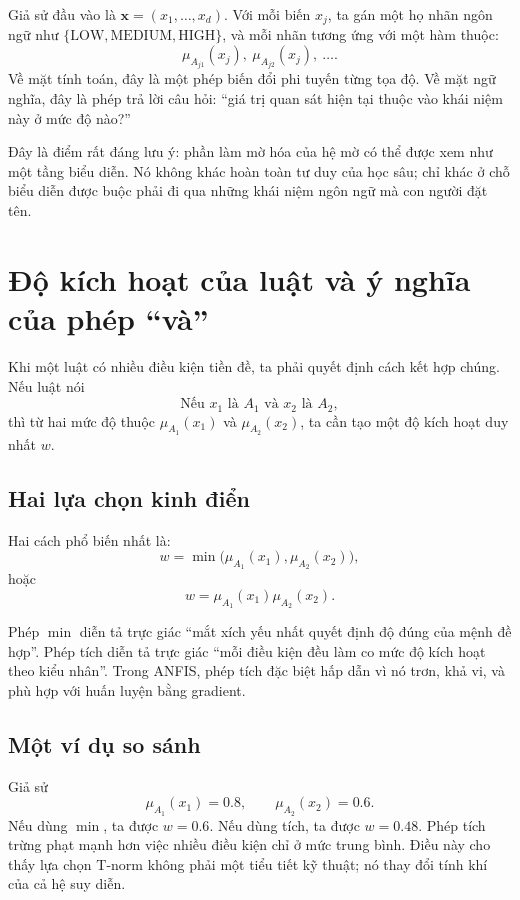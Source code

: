 Giả sử đầu vào là \(\bm{x}=(x_1,\dots,x_d)\). Với mỗi biến \(x_j\), ta gán một họ nhãn ngôn ngữ như \(\{\text{LOW}, \text{MEDIUM}, \text{HIGH}\}\), và mỗi nhãn tương ứng với một hàm thuộc:
\[
\mu_{A_{j1}}(x_j),\ \mu_{A_{j2}}(x_j),\ \dots.
\]
Về mặt tính toán, đây là một phép biến đổi phi tuyến từng tọa độ. Về mặt ngữ nghĩa, đây là phép trả lời câu hỏi: ``giá trị quan sát hiện tại thuộc vào khái niệm này ở mức độ nào?''

Đây là điểm rất đáng lưu ý: phần làm mờ hóa của hệ mờ có thể được xem như một tầng biểu diễn. Nó không khác hoàn toàn tư duy của học sâu; chỉ khác ở chỗ biểu diễn được buộc phải đi qua những khái niệm ngôn ngữ mà con người đặt tên.

\section{Độ kích hoạt của luật và ý nghĩa của phép ``và''}

Khi một luật có nhiều điều kiện tiền đề, ta phải quyết định cách kết hợp chúng. Nếu luật nói
\[
\text{Nếu } x_1 \text{ là } A_1 \text{ và } x_2 \text{ là } A_2,
\]
thì từ hai mức độ thuộc \(\mu_{A_1}(x_1)\) và \(\mu_{A_2}(x_2)\), ta cần tạo một độ kích hoạt duy nhất \(w\).

\subsection{Hai lựa chọn kinh điển}

Hai cách phổ biến nhất là:
\[
w=\min\big(\mu_{A_1}(x_1),\mu_{A_2}(x_2)\big),
\]
hoặc
\[
w=\mu_{A_1}(x_1)\mu_{A_2}(x_2).
\]

Phép \(\min\) diễn tả trực giác ``mắt xích yếu nhất quyết định độ đúng của mệnh đề hợp''. Phép tích diễn tả trực giác ``mỗi điều kiện đều làm co mức độ kích hoạt theo kiểu nhân''. Trong ANFIS, phép tích đặc biệt hấp dẫn vì nó trơn, khả vi, và phù hợp với huấn luyện bằng gradient.

\subsection{Một ví dụ so sánh}

Giả sử
\[
\mu_{A_1}(x_1)=0.8,\qquad \mu_{A_2}(x_2)=0.6.
\]
Nếu dùng \(\min\), ta được \(w=0.6\). Nếu dùng tích, ta được \(w=0.48\). Phép tích trừng phạt mạnh hơn việc nhiều điều kiện chỉ ở mức trung bình. Điều này cho thấy lựa chọn T-norm không phải một tiểu tiết kỹ thuật; nó thay đổi tính khí của cả hệ suy diễn.

